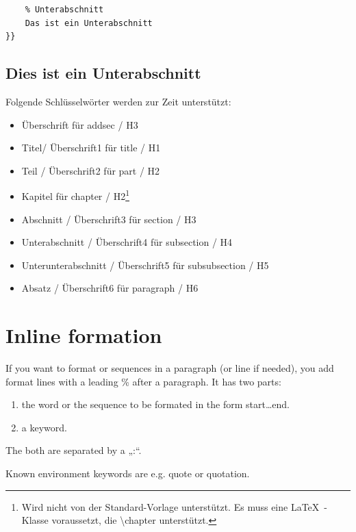 \documentclass{scrartcl}
\begin{document}
\colorbox{gray!75}{\parbox{\linewidth}{%
\begin{verbatim}
    % Unterabschnitt
    Das ist ein Unterabschnitt
}}

\end{verbatim}

\subsection{Dies ist ein Unterabschnitt}

Folgende Schlüsselwörter werden zur Zeit unterstützt:

\begin{itemize}
\item Überschrift für addsec / H3
\item Titel/ Überschrift1  für title / H1
\item Teil / Überschrift2 für part / H2
\item Kapitel für chapter / H2\footnote{Wird nicht von der Standard-Vorlage unterstützt. Es muss eine \LaTeX\ -Klasse voraussetzt, die \textbackslash chapter unterstützt.}\xspace  
\item Abschnitt / Überschrift3 für section / H3
\item Unterabschnitt / Überschrift4 für subsection / H4
\item Unterunterabschnitt / Überschrift5 für subsubsection / H5
\item Absatz / Überschrift6 für paragraph / H6

\end{itemize}

\section{Inline formation}

If you want to format \xspace  or sequences in a paragraph (or
line if needed), you add format lines with a leading \% after
a paragraph. It has two parts:

\begin{enumerate}
\item the word or the sequence to be formated in the form
start…end. 
\item a keyword.

\end{enumerate}

The both are separated by a „:“.

Known environment keywords are e.g. quote or quotation.

}}
\end{document}
